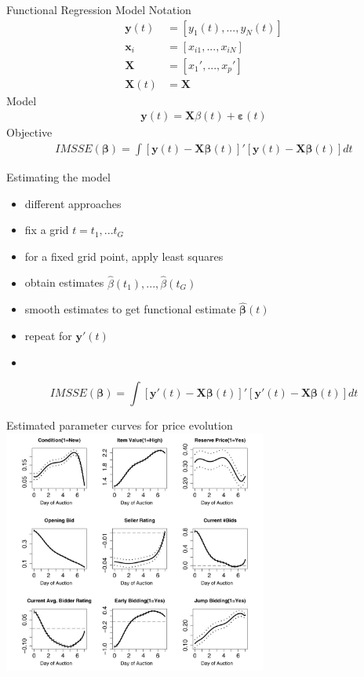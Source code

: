 \documentclass[hyperref={pdfpagelabels=false}]{beamer}
\begin{document}
    \begin{frame}{Functional Regression Model}
    Notation
    \begin{align*}
    \mathbf{y}(t) &= [y_1(t),...,y_N(t)] \\ \mathbf{x}_i&=[x_{i1},...,x_{iN}] \\ \mathbf{X} &= [x_1',...,x_p'] \\\mathbf{X}(t)&=\mathbf{X}  
    \end{align*}
    Model
    \begin{align*}
    \mathbf{y}(t)=\mathbf{X}\beta(t)+\boldsymbol\varepsilon(t)     
    \end{align*}
    Objective
    \begin{align*}
    IMSSE(\boldsymbol{\beta})=\int[\mathbf{y}(t)-\mathbf{X}\boldsymbol\beta(t)]'[\mathbf{y}(t)-    \mathbf{X}\boldsymbol\beta(t)]dt
    \end{align*}
    \end{frame}

\begin{frame}{Estimating the model}
\begin{itemize}
\item different approaches
\item fix a grid $t=t_1,...t_G$
\item for a fixed grid point, apply least squares
\item obtain estimates $\hat{\beta}(t_1),...,\hat{\beta}(t_G)$ 
\item smooth estimates to get functional estimate $\mathbf{\hat{\pmb{\beta}}}(t)$ 
\item repeat for $\mathbf{y}'(t)$
\item[]
\end{itemize}
\begin{equation}
IMSSE(\boldsymbol{\beta})=\int[\mathbf{y}'(t)-\mathbf{X}\boldsymbol\beta(t)]'[\mathbf{y}'(t)-    \mathbf{X}\boldsymbol\beta(t)]dt \nonumber
\end{equation}
\end{frame}

\begin{frame}{Estimated parameter curves for price evolution}
\center
\includegraphics[width=0.65\textwidth]{price_evolution}
\end{frame}
\end{document}
